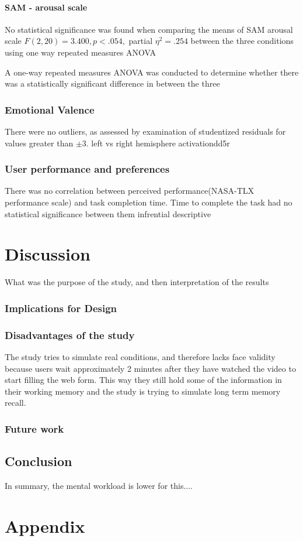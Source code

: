 \documentclass[a4paper]{report}
\begin{document}
			\subsubsection{SAM - arousal scale}
			No statistical significance was found when comparing the means of SAM arousal scale $F(2,20)=3.400, p<.054,$ partial $\eta^{2}=.254$ between the three conditions using one way repeated measures ANOVA
			
			A one-way repeated measures ANOVA was conducted to determine whether there was a statistically significant difference in  between the three
		\subsection{Emotional Valence}
				There were no outliers, as assessed by examination of studentized residuals for values greater than $\pm$3.
				left vs right hemisphere activationdd5r
			\subsection{User performance and preferences}
			There was no correlation between perceived performance(NASA-TLX performance scale) and task completion time.
			Time to complete the task had no statistical significance between them
			infrential
			descriptive
\chapter{Discussion}
	What was the purpose of the study, and then interpretation of the results
		\subsection{Implications for Design}
		\subsection{Disadvantages of the study}
		The study tries to simulate real conditions, and therefore lacks face validity because users wait approximately 2 minutes after they have watched the video to start filling the web form. This way they still hold some of the information in their working memory and the study is trying to simulate long term memory recall.
		\subsection{Future work}
	\section{Conclusion}
	In summary, the mental workload is lower for this....


	
	
\chapter*{Appendix}
\end{document}
